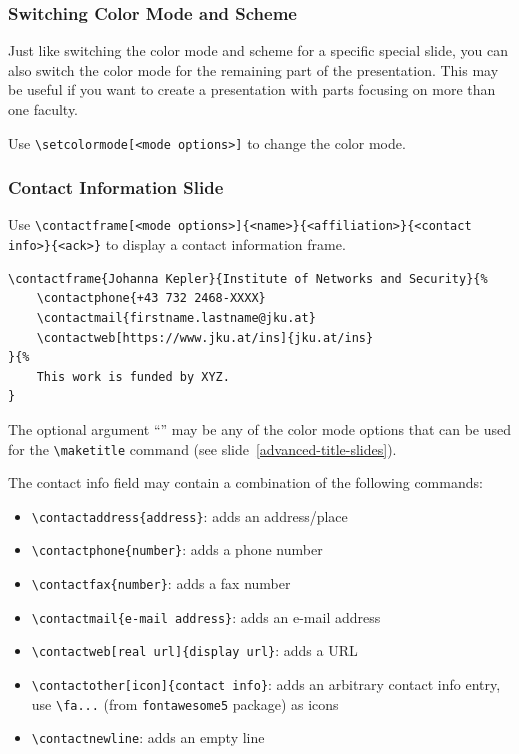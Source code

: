 \documentclass[utf8,aspectratio=169,ngerman,english]{beamer}
\begin{document}
\jkulogo
\jkulogo[light]
\jkulogo[dark]
\jkulogo[gray]
\jkulogo[black]


\begin{frame}[containsverbatim]
\frametitle{Switching Color Mode and Scheme}

Just like switching the color mode and scheme for a specific special slide, you can also switch the color mode for the remaining part of the presentation. This may be useful if you want to create a presentation with parts focusing on more than one faculty.

Use \verb|\setcolormode[<mode options>]| to change the color mode.
\end{frame}


\begin{frame}
\frametitle{Contact Information Slide}

Use \verb|\contactframe[<mode options>]{<name>}{<affiliation>}{<contact info>}{<ack>}| to display a contact information frame. 
\begin{lstlisting}[language={[LaTeX]TeX},numbers=none]
\contactframe{Johanna Kepler}{Institute of Networks and Security}{%
    \contactphone{+43 732 2468-XXXX}
    \contactmail{firstname.lastname@jku.at}
    \contactweb[https://www.jku.at/ins]{jku.at/ins}
}{%
    This work is funded by XYZ.
}
\end{lstlisting}
The optional argument ``'' may be any of the color mode options that can be used for the \verb|\maketitle| command (see slide~\ref{advanced-title-slides}).

\framebreak
The contact info field may contain a combination of the following commands:
\begin{itemize}
\item \verb|\contactaddress{address}|: adds an address/place
\item \verb|\contactphone{number}|: adds a phone number
\item \verb|\contactfax{number}|: adds a fax number
\item \verb|\contactmail{e-mail address}|: adds an e-mail address
\item \verb|\contactweb[real url]{display url}|: adds a URL
\item \verb|\contactother[icon]{contact info}|: adds an arbitrary contact info entry, use \verb|\fa...| (from \verb|fontawesome5| package) as icons
\item \verb|\contactnewline|: adds an empty line
\end{itemize}
\end{frame}
\end{document}
